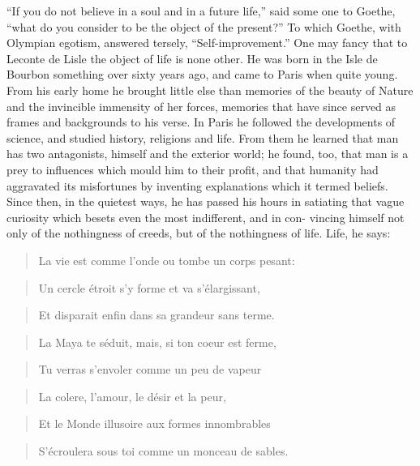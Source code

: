\documentclass[]{book}
\begin{document}
``If you do not believe in a soul and in a future life,'' said some one
to Goethe, ``what do you consider to be the object of the present?'' To
which Goethe, with Olympian egotism, answered tersely,
``Self-improvement.'' One may fancy that to Leconte de Lisle the object
of life is none other. He was born in the Isle de Bourbon something over
sixty years ago, and came to Paris when quite young. From his early home
he brought little else than memories of the beauty of Nature and the
invincible immensity of her forces, memories that have since served as
frames and backgrounds to his verse. In Paris he followed the
developments of science, and studied history, religions and life. From
them he learned that man has two antagonists, himself and the exterior
world; he found, too, that man is a prey to influences which mould him
to their profit, and that humanity had aggravated its misfortunes by
inventing explanations which it termed beliefs. Since then, in the
quietest ways, he has passed his hours in satiating that vague curiosity
which besets even the most indifferent, and in con- vincing himself not
only of the nothingness of creeds, but of the nothingness of life. Life,
he says:

\begin{quote}
La vie est comme l'onde ou tombe un corps pesant:
\end{quote}

\begin{quote}
Un cercle étroit s'y forme et va s'élargissant,
\end{quote}

\begin{quote}
Et disparait enfin dans sa grandeur sans terme.
\end{quote}

\begin{quote}
La Maya te séduit, mais, si ton coeur est ferme,
\end{quote}

\begin{quote}
Tu verras s'envoler comme un peu de vapeur
\end{quote}

\begin{quote}
La colere, l'amour, le désir et la peur,
\end{quote}

\begin{quote}
Et le Monde illusoire aux formes innombrables
\end{quote}

\begin{quote}
S'écroulera sous toi comme un monceau de sables.
\end{quote}
\end{document}
